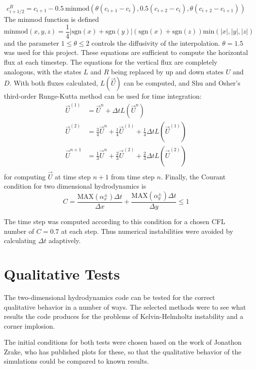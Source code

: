 \documentclass{article}
\begin{document}
$$c^R_{i+1/2} = c_{i+1} - 0.5 \ \text{minmod}(\theta(c_{i+1} - c_i), 0.5(c_{i+2} - c_i), \theta(c_{i+2} - c_{i+1}))$$ The minmod function is defined
$$\text{minmod} (x,y,z) = \frac{1}{4} |\text{sgn}(x) + \text{sgn}(y)| (\text{sgn}(x) + \text{sgn}(z)) \text{min} (|x|,|y|,|z|)$$ and the parameter $1 \leq \theta \leq 2$ controls the diffusivity of the interpolation. $\theta = 1.5$ was used for this project. These equations are sufficient to compute the horizontal flux at each timestep. The equations for the vertical flux are completely analogous, with the states $L$ and $R$ being replaced by up and down states $U$ and $D$. With both fluxes calculated, $L(\vec U)$ can be computed, and Shu and Osher's third-order Runge-Kutta method can be used for time integration:
\begin{align*}
    \vec U ^{(1)} &= \vec U ^n + \Delta t L(\vec U^n) \\
    \vec U ^{(2)} &= \frac{3}{4} \vec U^n + \frac{1}{4} \vec U^ {(1)} + \frac{1}{4} \Delta t L(\vec U^{(1)}) \\
    \vec U ^{n+1} &= \frac{1}{3} \vec U^n + \frac{2}{3} \vec U^{(2)} +\frac{2}{3} \Delta t L(\vec U^{(2)}) \\
\end{align*}
for computing $\vec U$ at time step $n+1$ from time step $n$. Finally, the Courant condition for two dimensional hydrodynamics is $$C = \frac{\text{MAX}(\alpha_x^\pm) \Delta t}{\Delta x} + \frac{\text{MAX}(\alpha_y^\pm) \Delta t}{\Delta y} \leq 1 $$

The time step was computed according to this condition for a chosen CFL number of $C = 0.7$ at each step. Thus numerical instabilities were avoided by calculating $\Delta t$ adaptively. 
\section{Qualitative Tests}
The two-dimensional hydrodynamics code can be tested for the correct qualitative behavior in a number of ways. The selected methods were to see what results the code produces for the problems of Kelvin-Helmholtz instability and a corner implosion.

The initial conditions for both tests were chosen based on the work of Jonathon Zrake, who has published plots for these, so that the qualitative behavior of the simulations could be compared to known results.
\end{document}
